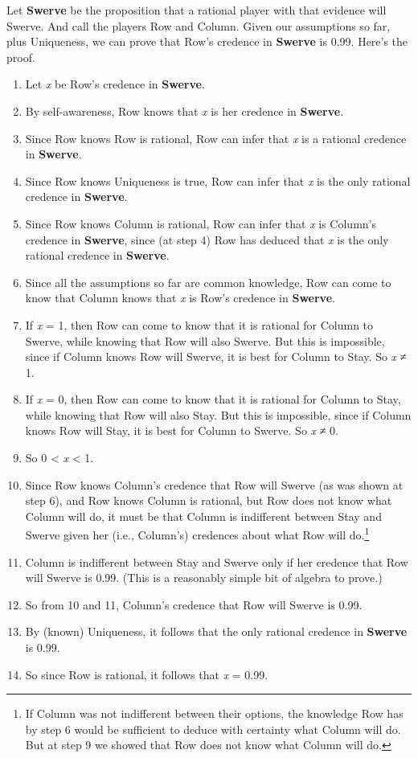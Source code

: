 \documentclass[
  12pt,
  letterpaper,
  DIV=11,
  numbers=noendperiod]{scrreprt}
\providecommand{\tightlist}{%
  \setlength{\itemsep}{0pt}\setlength{\parskip}{0pt}}\usepackage{longtable,booktabs,array}
\begin{document}
Let \textbf{Swerve} be the proposition that a rational player with that
evidence will Swerve. And call the players Row and Column. Given our
assumptions so far, plus Uniqueness, we can prove that Row's credence in
\textbf{Swerve} is 0.99. Here's the proof.

\begin{enumerate}
\def\labelenumi{\arabic{enumi}.}
\tightlist
\item
  Let \emph{x} be Row's credence in \textbf{Swerve}.
\item
  By self-awareness, Row knows that \emph{x} is her credence in
  \textbf{Swerve}.
\item
  Since Row knows Row is rational, Row can infer that \emph{x} is a
  rational credence in \textbf{Swerve}.
\item
  Since Row knows Uniqueness is true, Row can infer that \emph{x} is the
  only rational credence in \textbf{Swerve}.
\item
  Since Row knows Column is rational, Row can infer that \emph{x} is
  Column's credence in \textbf{Swerve}, since (at step 4) Row has
  deduced that \emph{x} is the only rational credence in
  \textbf{Swerve}.
\item
  Since all the assumptions so far are common knowledge, Row can come to
  know that Column knows that \emph{x} is Row's credence in
  \textbf{Swerve}.
\item
  If \emph{x} = 1, then Row can come to know that it is rational for
  Column to Swerve, while knowing that Row will also Swerve. But this is
  impossible, since if Column knows Row will Swerve, it is best for
  Column to Stay. So \emph{x} ≠ 1.
\item
  If \emph{x} = 0, then Row can come to know that it is rational for
  Column to Stay, while knowing that Row will also Stay. But this is
  impossible, since if Column knows Row will Stay, it is best for Column
  to Swerve. So \emph{x} ≠ 0.
\item
  So 0 \textless{} \emph{x} \textless{} 1.
\item
  Since Row knows Column's credence that Row will Swerve (as was shown
  at step 6), and Row knows Column is rational, but Row does not know
  what Column will do, it must be that Column is indifferent between
  Stay and Swerve given her (i.e., Column's) credences about what Row
  will do.\footnote{If Column was not indifferent between their options,
    the knowledge Row has by step 6 would be sufficient to deduce with
    certainty what Column will do. But at step 9 we showed that Row does
    not know what Column will do.}
\item
  Column is indifferent between Stay and Swerve only if her credence
  that Row will Swerve is 0.99. (This is a reasonably simple bit of
  algebra to prove.)
\item
  So from 10 and 11, Column's credence that Row will Swerve is 0.99.
\item
  By (known) Uniqueness, it follows that the only rational credence in
  \textbf{Swerve} is 0.99.
\item
  So since Row is rational, it follows that \emph{x} = 0.99.
\end{enumerate}
\end{document}
